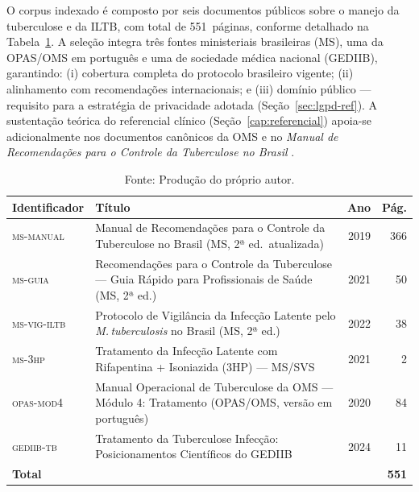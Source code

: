 \documentclass[
  12pt,
  oneside,
  a4paper,
  english,
  brazil
]{abntex2}
\begin{document}
O corpus indexado é composto por seis documentos públicos sobre o manejo da
tuberculose e da ILTB, com total de 551~páginas, conforme detalhado na
Tabela~\ref{tab:corpus}. A seleção integra três fontes ministeriais brasileiras
(MS), uma da OPAS/OMS em português e uma de sociedade médica nacional (GEDIIB),
garantindo: (i) cobertura completa do protocolo brasileiro vigente; (ii)
alinhamento com recomendações internacionais; e (iii) domínio público ---
requisito para a estratégia de privacidade adotada (Seção~\ref{sec:lgpd-ref}). A
sustentação teórica do referencial clínico (Seção~\ref{cap:referencial}) apoia-se
adicionalmente nos documentos canônicos da OMS \cite{who2018, who2023} e no
\textit{Manual de Recomendações para o Controle da Tuberculose no Brasil}
\cite{brasil2022}.

\begin{table}[h]
  \centering
  \caption{Documentos indexados no corpus do chatbot ILTB}
  \label{tab:corpus}
  \begin{tabularx}{\textwidth}{@{}lXrr@{}}
  \toprule
  \textbf{Identificador} & \textbf{Título} & \textbf{Ano} & \textbf{Pág.} \\
  \midrule
  \textsc{ms-manual}       & Manual de Recomendações para o Controle da
                             Tuberculose no Brasil (MS, 2ª ed.\ atualizada) &
                             2019 & 366 \\
  \textsc{ms-guia}         & Recomendações para o Controle da Tuberculose ---
                             Guia Rápido para Profissionais de Saúde (MS, 2ª
                             ed.) & 2021 & 50 \\
  \textsc{ms-vig-iltb}     & Protocolo de Vigilância da Infecção Latente pelo
                             \textit{M.\,tuberculosis} no Brasil (MS, 2ª ed.) &
                             2022 & 38 \\
  \textsc{ms-3hp}          & Tratamento da Infecção Latente com Rifapentina +
                             Isoniazida (3HP) --- MS/SVS & 2021 & 2 \\
  \textsc{opas-mod4}       & Manual Operacional de Tuberculose da OMS ---
                             Módulo 4: Tratamento (OPAS/OMS, versão em
                             português) & 2020 & 84 \\
  \textsc{gediib-tb}       & Tratamento da Tuberculose Infecção: Posicionamentos
                             Científicos do GEDIIB & 2024 & 11 \\
  \midrule
  \multicolumn{3}{l}{\textbf{Total}} & \textbf{551} \\
  \bottomrule
  \end{tabularx}
  \caption*{Fonte: Produção do próprio autor.}
\end{table}
\end{document}
